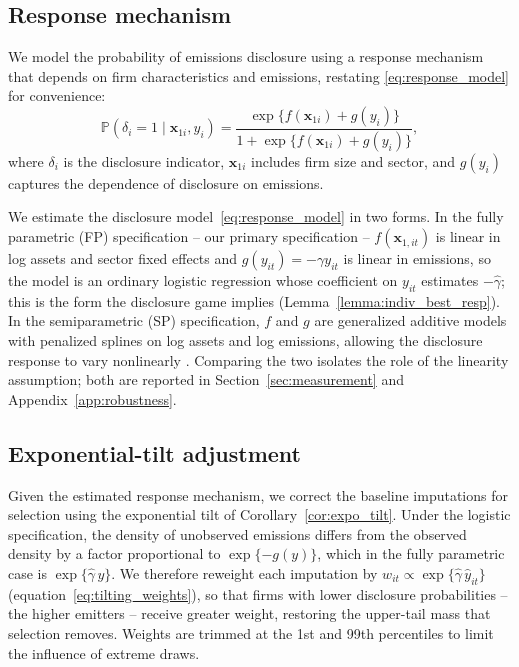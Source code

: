\documentclass[a4paper,12pt]{article}
\newcommand{\citep}[1]{\parencite{#1}}
\begin{document}
\subsection{Response mechanism}

We model the probability of emissions disclosure using a response mechanism that depends on firm characteristics and emissions, restating \eqref{eq:response_model} for convenience:
\begin{equation}
\label{eq:response_model_app}
\mathbb{P}(\delta_i = 1 \mid \mathbf{x}_{1i}, y_i)
=
\frac{\exp\{ f(\mathbf{x}_{1i}) + g(y_i) \}}
     {1 + \exp\{ f(\mathbf{x}_{1i}) + g(y_i) \}},
\end{equation}
where $\delta_i$ is the disclosure indicator, $\mathbf{x}_{1i}$ includes firm size and sector, and $g(y_i)$ captures the dependence of disclosure on emissions. 

We estimate the disclosure model~\eqref{eq:response_model} in two forms. In the fully parametric (FP) specification -- our primary specification -- $f(\mathbf{x}_{1,it})$ is linear in log assets and sector fixed effects and $g(y_{it}) = -\gamma y_{it}$ is linear in emissions, so the model is an ordinary logistic regression whose coefficient on $y_{it}$ estimates $-\hat\gamma$; this is the form the disclosure game implies (Lemma~\ref{lemma:indiv_best_resp}). In the semiparametric (SP) specification, $f$ and $g$ are generalized additive models with penalized splines on log assets and log emissions, allowing the disclosure response to vary nonlinearly \citep{yang2017semiparametric}. Comparing the two isolates the role of the linearity assumption; both are reported in Section~\ref{sec:measurement} and Appendix~\ref{app:robustness}.

\subsection{Exponential-tilt adjustment}

Given the estimated response mechanism, we correct the baseline imputations for selection using the exponential tilt of Corollary~\ref{cor:expo_tilt}. Under the logistic specification, the density of unobserved emissions differs from the observed density by a factor proportional to $\exp\{-g(y)\}$, which in the fully parametric case is $\exp\{\hat\gamma\, y\}$. We therefore reweight each imputation by $w_{it} \propto \exp\{\hat\gamma\, \hat{y}_{it}\}$ (equation~\eqref{eq:tilting_weights}), so that firms with lower disclosure probabilities -- the higher emitters -- receive greater weight, restoring the upper-tail mass that selection removes. Weights are trimmed at the 1st and 99th percentiles to limit the influence of extreme draws.
\end{document}
